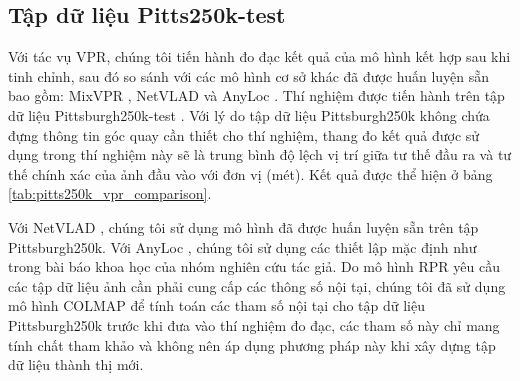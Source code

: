 \subsection*{Tập dữ liệu Pitts250k-test}
Với tác vụ VPR, chúng tôi tiến hành đo đạc kết quả của mô hình kết hợp sau khi tinh chỉnh, sau đó so sánh với các mô hình cơ sở khác đã được huấn luyện sẵn bao gồm: MixVPR \cite{alibey2023mixvpr}, NetVLAD \cite{arandjelovic2016netvlad} và AnyLoc \cite{keetha2023anyloc}. Thí nghiệm được tiến hành trên tập dữ liệu Pittsburgh250k-test \cite{6618963}. Với lý do tập dữ liệu Pittsburgh250k không chứa đựng thông tin góc quay cần thiết cho thí nghiệm, thang đo kết quả được sử dụng trong thí nghiệm này sẽ là trung bình độ lệch vị trí giữa tư thế đầu ra và tư thế chính xác của ảnh đầu vào với đơn vị (mét). Kết quả được thể hiện ở bảng \ref{tab:pitts250k_vpr_comparison}.

Với NetVLAD \cite{arandjelovic2016netvlad}, chúng tôi sử dụng mô hình đã được huấn luyện sẵn trên tập Pittsburgh250k. Với AnyLoc \cite{keetha2023anyloc}, chúng tôi sử dụng các thiết lập mặc định như trong bài báo khoa học của nhóm nghiên cứu tác giả. Do mô hình RPR yêu cầu các tập dữ liệu ảnh cần phải cung cấp các thông số nội tại, chúng tôi đã sử dụng mô hình COLMAP\cite{schoenberger2016sfm} để tính toán các tham số nội tại cho tập dữ liệu Pittsburgh250k trước khi đưa vào thí nghiệm đo đạc, các tham số này chỉ mang tính chất tham khảo và không nên áp dụng phương pháp này khi xây dựng tập dữ liệu thành thị mới.

